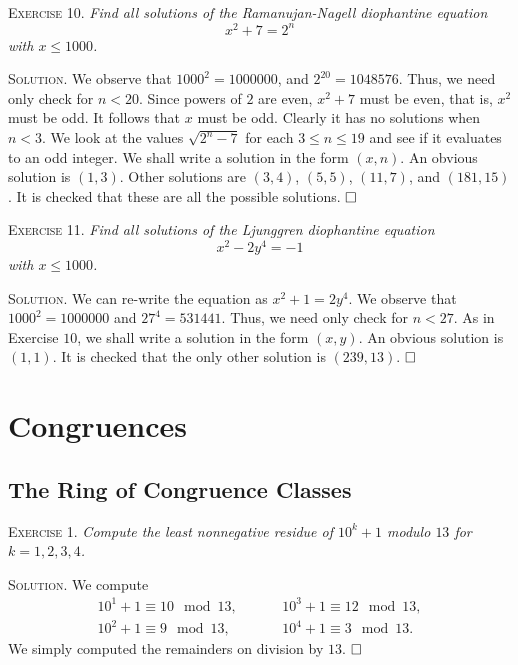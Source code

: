 \documentclass[11pt, leqno]{article}
\newcommand{\done}{\ensuremath{\hfill\square}}
\begin{document}
\textsc{Exercise 10}. \emph{Find all solutions of the Ramanujan-Nagell diophantine equation 
\begin{displaymath}
x^2 + 7 = 2^n
\end{displaymath}
with $x \leq 1000$.}

\textsc{Solution}. We observe that $1000^2 = 1000000$, and $2^{20}  = 1048576$. Thus, we need only check for $n < 20$. Since powers of $2$ are even, $x^2 + 7$ must be even, that is, $x^2$ must be odd. It follows that $x$ must be odd. Clearly it has no solutions when $n < 3$. We look at the values $\sqrt{2^n - 7}$ for each $3 \leq n \leq 19$ and see if it evaluates to an odd integer. We shall write a solution in the form $(x,n)$. An obvious solution is $(1,3)$. Other solutions are $(3,4)$, $(5,5)$, $(11,7)$, and $(181, 15)$. It is checked that these are all the possible solutions. \done

\textsc{Exercise 11}. \emph{Find all solutions of the Ljunggren diophantine equation 
\begin{displaymath}
x^2 - 2y^4 = -1
\end{displaymath}
with $x \leq 1000$.}

\textsc{Solution}. We can re-write the equation as $x^2 + 1 = 2y^4$. We observe that $1000^2 = 1000000$ and $27^4 = 531441$. Thus, we need only check for $n < 27$. As in Exercise $10$, we shall write a solution in the form $(x,y)$. An obvious solution is $(1,1)$. It is checked that the only other solution is $(239, 13)$. \done

\section{Congruences}

\subsection{The Ring of Congruence Classes}

\textsc{Exercise 1}. \emph{Compute the least nonnegative residue of $10^k + 1$ modulo $13$ for $k = 1, 2, 3, 4$.}

\textsc{Solution}. We compute 
\begin{align*}
  10^1+1 \equiv 10 \mod 13, \hspace{1cm} &10^3+1 \equiv 12 \mod 13,\\
  10^2+1 \equiv 9 \mod 13, \hspace{1cm} &10^4+1 \equiv 3 \mod 13.
\end{align*}
We simply computed the remainders on division by $13$. \done
\end{document}
